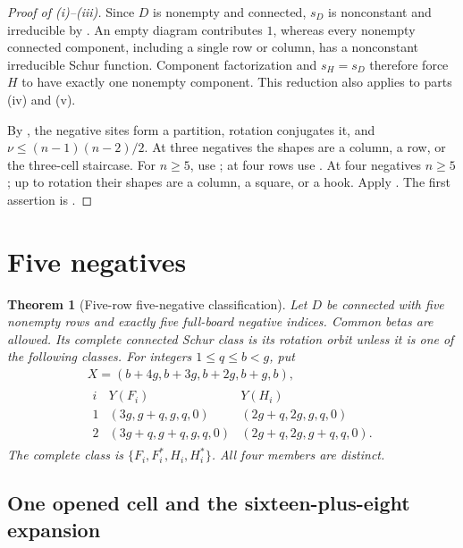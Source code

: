 \documentclass[11pt,a4paper]{amsart}
\numberwithin{equation}{section}
\theoremstyle{plain}
\newtheorem{theorem}{Theorem}[section]
\theoremstyle{definition}
\begin{document}
\begin{proof}[Proof of (i)--(iii)]
Since \(D\) is nonempty and connected, \(s_D\) is nonconstant and
irreducible by \cite{Barekat2009CoincidencesCorrigendum}.  An empty
diagram contributes \(1\), whereas every nonempty connected component,
including a single row or column, has a nonconstant irreducible Schur
function.  Component factorization and \(s_H=s_D\) therefore force
\(H\) to have exactly one nonempty component.  This reduction also
applies to parts (iv) and (v).

By , the negative sites form a partition,
rotation conjugates it, and \(\nu\le(n-1)(n-2)/2\).
At three negatives the shapes are a column, a row, or the three-cell
staircase.  For \(n\ge5\), use ;
at four rows use .
At four negatives \(n\ge5\); up to rotation their shapes are a column,
a square, or a hook.  Apply .
The first assertion is .
\end{proof}

\section{Five negatives}\label{sec:five-base}

\begin{theorem}[Five-row five-negative classification]\label{thm:five-base}
Let \(D\) be connected with five nonempty rows and exactly five full-board
negative indices.  Common betas are allowed.  Its complete connected Schur
class is its rotation orbit unless it is one of the following classes.
For integers \(1\le q\le b<g\), put
\begin{equation}\label{eq:five-families}
 \begin{gathered}
 X=(b+4g,b+3g,b+2g,b+g,b),\\
 \begin{array}{c|c|c}
 i&Y(F_i)&Y(H_i)\\\hline
 1&(3g,g+q,g,q,0)&(2g+q,2g,g,q,0)\\
 2&(3g+q,g+q,g,q,0)&(2g+q,2g,g+q,q,0).
 \end{array}
 \end{gathered}
\end{equation}
The complete class is \(\{F_i,F_i^*,H_i,H_i^*\}\).  All four members are
distinct.
\end{theorem}

\subsection{One opened cell and the sixteen-plus-eight expansion}
\end{document}

